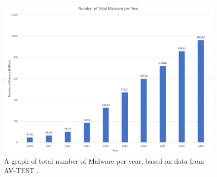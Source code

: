 \documentclass[pdf,bookmarks,colorlinks=true]{IEEEtran}
\begin{document}
\begin{figure}[tbh]
	\centering
	\includegraphics[width=0.7\linewidth]{"Total Number Of Malware per Year"}
	\caption{A graph of total number of Malware per year, based on data from AV-TEST \cite{AVtest}.}
	\label{fig:total-number-of-malware-per-year}
\end{figure}
\end{document}
